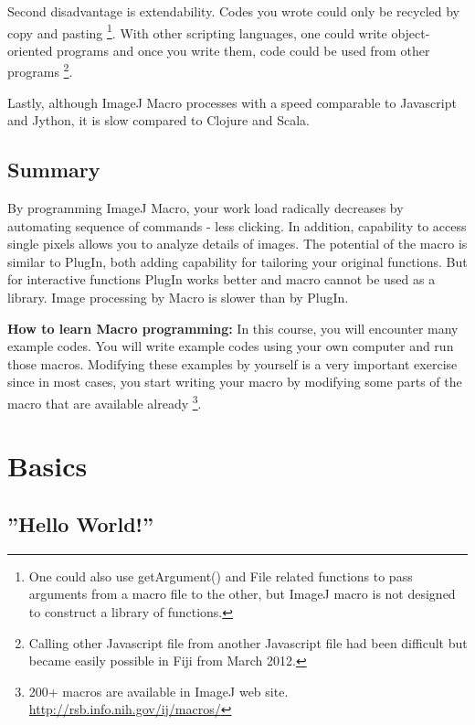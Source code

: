 \documentclass[11pt,a4paper,oneside]{report}
\begin{document}
Second disadvantage is extendability.
Codes you wrote could only be recycled by copy and pasting
\footnote{One could also use getArgument() and File related functions to pass
arguments from a macro file to the other, but ImageJ macro is not designed to
construct a library of functions.}.
With other scripting languages, one could write object-oriented programs 
and once you write them, code could be used from other programs
\footnote{ Calling other Javascript file from another Javascript file had been difficult but became easily possible in Fiji from March 2012.}.

Lastly, although ImageJ Macro processes with a speed comparable to
Javascript and Jython, it is slow compared to Clojure and Scala. 

\subsection{Summary}
By programming ImageJ Macro, your work load radically decreases by automating sequence of commands - less clicking. 
In addition, capability to access single pixels allows you to analyze details of images. 
The potential of the macro is similar to PlugIn, both adding capability for tailoring your original functions. But for interactive functions PlugIn works better and macro cannot be used as a library.  
Image processing by Macro is slower than by PlugIn. 

\textbf{How to learn Macro programming:} 
In this course, you will encounter many example codes. 
You will write example codes using your own computer and run those macros. 
Modifying these examples by yourself is a very important exercise since in most
cases, you start writing your macro by modifying some parts of the macro that are available already \footnote{200+ macros are available in ImageJ web site. 
\href{http://rsb.info.nih.gov/ij/macros/}{http://rsb.info.nih.gov/ij/macros/}}.
 
\newpage
\section{Basics}

\subsection{''Hello World!''}
\end{document}
